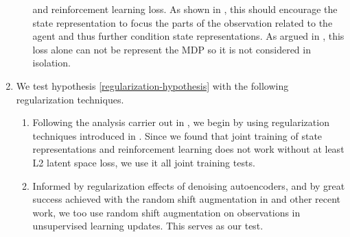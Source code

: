 \begin{enumerate}
\begin{enumerate}
						and reinforcement learning loss. As shown in \cite{icm}, this should encourage
						the state representation to focus the parts of the observation related to the agent
						and thus further condition state representations. As argued
						in \cite{rakelly2021mutual}, this loss alone can not be represent the MDP so it is not 
						considered in isolation.
		\end{enumerate}
\item We test hypothesis \ref{regularization-hypothesis} with the following regularization techniques.
		\begin{enumerate}
				\item Following the analysis carrier out in \cite{sac+ae}, we begin by using
						regularization techniques introduced in \cite{ghosh2019variational}.
					Since we found that joint training of state representations and reinforcement learning
					does not work without at least L2 latent space loss, we use it all joint training tests.
			\item Informed by regularization effects of denoising autoencoders, and by great success achieved
					with the random shift augmentation in \cite{drqv1, drqv2} and other recent work,
					we too use random shift augmentation on observations in unsupervised learning updates.
					This serves as our test.
		\end{enumerate}
\end{enumerate}




